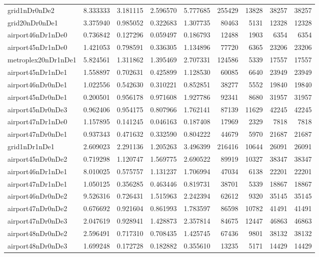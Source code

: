 \begin{longtable}{|l|r|r|r|r|r|r|r|r|}
grid1nDr0nDe2 & 8.333333 & 3.181115 & 2.596570 & 5.777685 & 255429 & 13828 & 38257 & 38257 \\
grid20nDr0nDe1 & 3.375940 & 0.985052 & 0.322683 & 1.307735 & 80463 & 5131 & 12328 & 12328 \\
airport46nDr1nDe0 & 0.736842 & 0.127296 & 0.059497 & 0.186793 & 12488 & 1903 & 6354 & 6354 \\
airport45nDr1nDe0 & 1.421053 & 0.798591 & 0.336305 & 1.134896 & 77720 & 6365 & 23206 & 23206 \\
metroplex20nDr1nDe1 & 5.824561 & 1.311862 & 1.395469 & 2.707331 & 124586 & 5339 & 17557 & 17557 \\
airport45nDr1nDe1 & 1.558897 & 0.702631 & 0.425899 & 1.128530 & 60085 & 6640 & 23949 & 23949 \\
airport46nDr0nDe1 & 1.022556 & 0.542630 & 0.310221 & 0.852851 & 38277 & 5552 & 19840 & 19840 \\
airport45nDr0nDe1 & 0.200501 & 0.956178 & 0.971608 & 1.927786 & 92341 & 8680 & 31957 & 31957 \\
airport45nDr0nDe3 & 0.962406 & 0.954175 & 0.807966 & 1.762141 & 87139 & 11629 & 42245 & 42245 \\
airport47nDr1nDe0 & 1.157895 & 0.141245 & 0.046163 & 0.187408 & 17969 & 2329 & 7818 & 7818 \\
airport47nDr0nDe1 & 0.937343 & 0.471632 & 0.332590 & 0.804222 & 44679 & 5970 & 21687 & 21687 \\
grid1nDr1nDe1 & 2.609023 & 2.291136 & 1.205263 & 3.496399 & 216416 & 10644 & 26091 & 26091 \\
airport45nDr0nDe2 & 0.719298 & 1.120747 & 1.569775 & 2.690522 & 89919 & 10327 & 38347 & 38347 \\
airport46nDr1nDe1 & 8.010025 & 0.575757 & 1.131237 & 1.706994 & 47034 & 6138 & 22201 & 22201 \\
airport47nDr1nDe1 & 1.050125 & 0.356285 & 0.463446 & 0.819731 & 38701 & 5339 & 18867 & 18867 \\
airport46nDr0nDe2 & 9.526316 & 0.726431 & 1.515963 & 2.242394 & 62612 & 9320 & 35145 & 35145 \\
airport47nDr0nDe2 & 0.676692 & 0.921604 & 0.861993 & 1.783597 & 86598 & 10782 & 41491 & 41491 \\
airport47nDr0nDe3 & 2.047619 & 0.928941 & 1.428873 & 2.357814 & 84675 & 12447 & 46863 & 46863 \\
airport48nDr0nDe2 & 2.596491 & 0.717310 & 0.708435 & 1.425745 & 67436 & 9801 & 38132 & 38132 \\
airport48nDr0nDe3 & 1.699248 & 0.172728 & 0.182882 & 0.355610 & 13235 & 5171 & 14429 & 14429 \\

\end{longtable}
